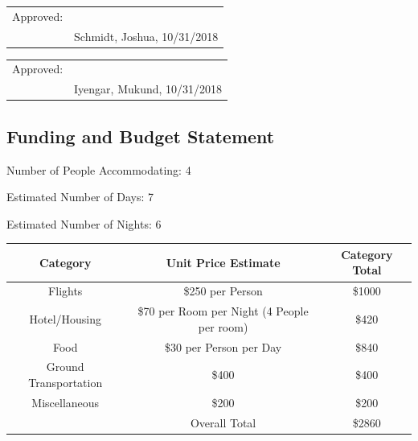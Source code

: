 \documentclass{article}
\let\Oldsubsection\subsection
\renewcommand{\subsection}{\FloatBarrier\Oldsubsection}
\begin{document}
\bigskip
\bigskip
\bigskip

\begin{tabular}{@{}p{.5in}p{3.5in}@{}}
Approved: & \hrulefill \\
& Schmidt, Joshua, 10/31/2018\\
\end{tabular}

\bigskip
\bigskip
\bigskip

\begin{tabular}{@{}p{.5in}p{3.5in}@{}}
Approved: & \hrulefill \\
& Iyengar, Mukund, 10/31/2018\\
\end{tabular}

\newpage

\subsection{Funding and Budget Statement}

\bigskip

\hspace{4mm} Number of People Accommodating: 4

\bigskip

Estimated Number of Days: 7

\bigskip

Estimated Number of Nights: 6

\bigskip
\bigskip

\begin{tabular}{||c c c||} 
  \hline
  Category & Unit Price Estimate & Category Total \\ [0.5ex] 
  \hline\hline
  Flights & \$250 per Person & \$1000 \\ 
  \hline
  Hotel/Housing & \$70 per Room per Night (4 People per room) & \$420 \\
  \hline
  Food & \$30 per Person per Day & \$840 \\
  \hline
  Ground Transportation & \$400 & \$400 \\
  \hline
  Miscellaneous & \$200 & \$200 \\
  \hline
   & Overall Total & \$2860 \\
  \hline
 \end{tabular}
\end{document}
